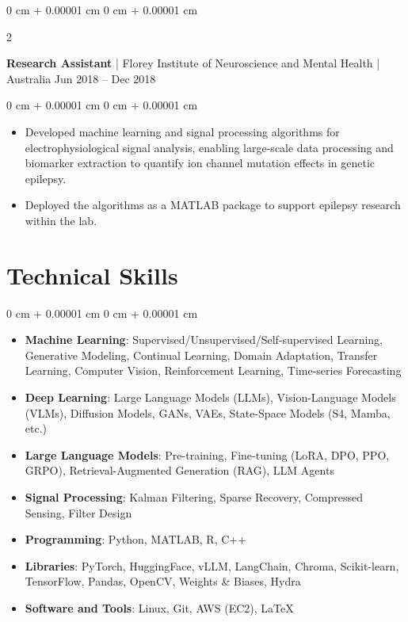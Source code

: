 \documentclass[10pt, letterpaper]{article}
\newenvironment{highlights}{
    \begin{itemize}[
        topsep=0.10 cm,
        parsep=0.10 cm,
        partopsep=0pt,
        itemsep=0pt,
        leftmargin=0 cm + 10pt
    ]
}{
    \end{itemize}
} %
\newenvironment{onecolentry}{
    \begin{adjustwidth}{
        0 cm + 0.00001 cm
    }{
        0 cm + 0.00001 cm
    }
}{
    \end{adjustwidth}
} %
\newenvironment{twocolentry}[2][]{
    \onecolentry
    \def\secondColumn{#2}
    \setcolumnwidth{\fill, 4.5 cm}
    \begin{paracol}{2}
}{
    \switchcolumn \raggedleft \secondColumn\strut
    \end{paracol}
    \endonecolentry
} %
\begin{document}
        \vspace{0.2 cm}
        \begin{twocolentry}{Jun 2018 – Dec 2018}
        \textbf{Research Assistant} | Florey Institute of Neuroscience and Mental Health | Australia\end{twocolentry}
        \vspace{0.10 cm}
        \begin{onecolentry}
            \begin{highlights}
                \item Developed machine learning and signal processing algorithms for electrophysiological signal analysis, enabling large-scale data processing and biomarker extraction to quantify ion channel mutation effects in genetic epilepsy.
                \item Deployed the algorithms as a MATLAB package to support epilepsy research within the lab.
            \end{highlights}
        \end{onecolentry}


    \section{Technical Skills}

    \begin{onecolentry}
        \begin{highlights}
            \item \textbf{Machine Learning}: Supervised/Unsupervised/Self-supervised Learning, Generative Modeling, Continual Learning, Domain Adaptation, Transfer Learning, Computer Vision, Reinforcement Learning, Time-series Forecasting
            \item \textbf{Deep Learning}: Large Language Models (LLMs), Vision-Language Models (VLMs), Diffusion Models, GANs, VAEs, State-Space Models (S4, Mamba, etc.)
            \item \textbf{Large Language Models}: Pre-training, Fine-tuning (LoRA, DPO, PPO, GRPO), Retrieval-Augmented Generation (RAG), LLM Agents
            \item \textbf{Signal Processing}: Kalman Filtering, Sparse Recovery, Compressed Sensing, Filter Design
            \item \textbf{Programming}: Python, MATLAB, R, C++
            \item \textbf{Libraries}: PyTorch, HuggingFace, vLLM, LangChain, Chroma, Scikit-learn, TensorFlow, Pandas, OpenCV, Weights \& Biases, Hydra
            \item \textbf{Software and Tools}: Linux, Git, AWS (EC2), \LaTeX
        \end{highlights}
    \end{onecolentry}
\end{document}

